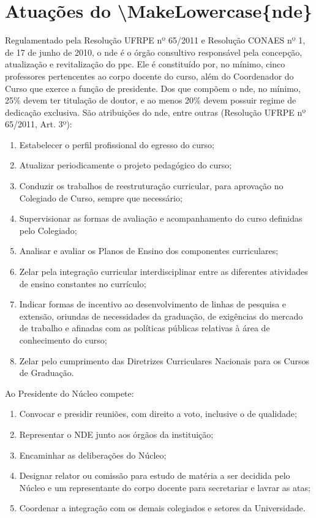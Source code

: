 \documentclass[
	12pt,				%
	openright,			%
  oneside,     %
	a4paper,			%
 hyphens,
	chapter=TITLE,		%
	english,			%
	french,				%
	spanish,			%
	brazil				%
	]{abntex2}
\begin{document}
\section{Atuações do \acrfull{\MakeLowercase{nde}}}

Regulamentado pela Resolução UFRPE nº 65/2011 e Resolução CONAES nº 1, de 17 de junho de 2010, o \acrshort{nde} é o órgão consultivo responsável pela concepção, atualização e revitalização do \acrshort{ppc}. Ele é constituído por, no mínimo, cinco professores pertencentes ao corpo docente do curso, além do Coordenador do Curso que exerce a função de presidente. Dos que compõem o \acrshort{nde}, no mínimo, 25\% devem ter titulação de doutor, e ao menos 20\% devem possuir regime de dedicação exclusiva. São atribuições do \acrshort{nde}, entre outras (Resolução UFRPE nº 65/2011, Art. 3º):

\begin{enumerate}
    \item Estabelecer o perfil profissional do egresso do curso; 	
    \item Atualizar periodicamente o projeto pedagógico do curso; 	
    \item Conduzir os trabalhos de reestruturação curricular, para aprovação no Colegiado de Curso, sempre que necessário;
    \item Supervisionar as formas de avaliação e acompanhamento do curso definidas pelo Colegiado; 	
    \item Analisar e avaliar os Planos de Ensino dos componentes curriculares;
    \item Zelar pela integração curricular interdisciplinar entre as diferentes atividades de ensino constantes no currículo; 	
    \item Indicar formas de incentivo ao desenvolvimento de linhas de pesquisa e extensão, oriundas de necessidades da graduação, de exigências do mercado de trabalho e afinadas com as políticas públicas relativas à área de conhecimento do curso; 	
    \item Zelar pelo cumprimento das Diretrizes Curriculares Nacionais para os Cursos de Graduação.
\end{enumerate}

Ao Presidente do Núcleo compete:

\begin{enumerate}
    \item Convocar e presidir reuniões, com direito a voto, inclusive o de qualidade;
    \item Representar o NDE junto aos 	órgãos da instituição; 	
    \item Encaminhar as deliberações do Núcleo; 	
    \item Designar relator ou comissão 	para estudo de matéria a ser decidida pelo Núcleo e um representante do corpo docente para secretariar e lavrar as atas;
    \item Coordenar a integração com os demais colegiados e setores da Universidade.
\end{enumerate}
\end{document}
